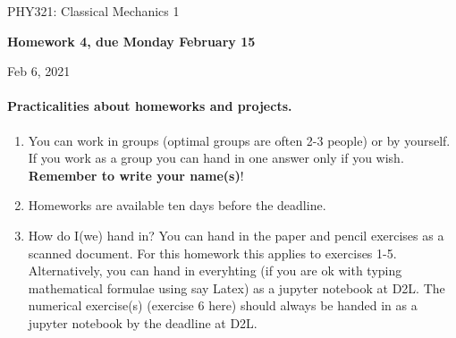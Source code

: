 \documentclass[%
oneside,                 %
final,                   %
10pt]{article}
\begin{document}

\newcommand{\exercisesection}[1]{\subsection*{#1}}






\thispagestyle{empty}

\begin{center}
{\LARGE\bf
\begin{spacing}{1.25}
PHY321: Classical Mechanics 1
\end{spacing}
}
\end{center}


\begin{center}
{\bf Homework 4, due Monday  February 15${}^{}$} \\ [0mm]
\end{center}

\begin{center}
\end{center}
    

\begin{center}
Feb 6, 2021
\end{center}

\vspace{1cm}


\paragraph{Practicalities about  homeworks and projects.}
\begin{enumerate}
\item You can work in groups (optimal groups are often 2-3 people) or by yourself. If you work as a group you can hand in one answer only if you wish. \textbf{Remember to write your name(s)}!

\item Homeworks are available ten days before the deadline.

\item How do I(we)  hand in?  You can hand in the paper and pencil exercises as a scanned document. For this homework this applies to exercises 1-5. Alternatively, you can hand in everyhting (if you are ok with typing mathematical formulae using say Latex) as a jupyter notebook at D2L. The numerical exercise(s) (exercise 6 here) should always be handed in as a jupyter notebook by the deadline at D2L. 
\end{enumerate}
\end{document}
